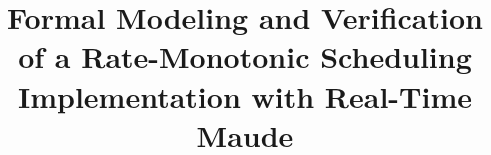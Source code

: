 \documentclass[10pt,journal]{IEEEtran}
\begin{document}
%
\title{Formal Modeling and Verification of a Rate-Monotonic Scheduling Implementation with Real-Time Maude}
%
%
%
%
\end{document}
